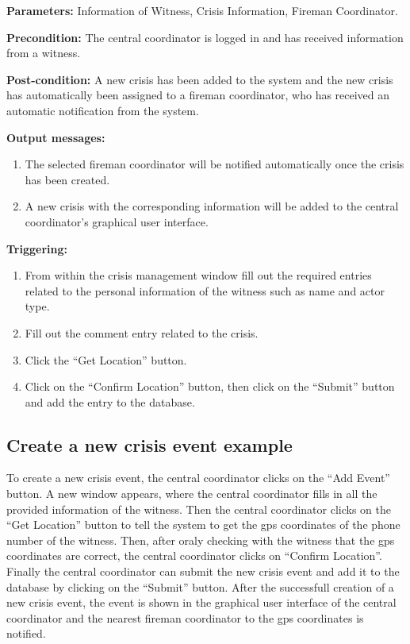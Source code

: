 \begin{description}

\item \textbf{Parameters:} Information of Witness, Crisis Information, Fireman
Coordinator.
\item \textbf{Precondition:} The central coordinator is logged in and has
received information from a witness.
\item \textbf{Post-condition:} A new crisis has been added to the system and the
new crisis has automatically been assigned to a fireman coordinator, who has
received an automatic notification from the system.
\item \textbf{Output messages:}\begin{enumerate}\item The selected fireman
coordinator will be notified automatically once the crisis has been created.
\item A new crisis with the corresponding information will be added to the
central coordinator's graphical user interface.
\end{enumerate}

\item \textbf{Triggering:}
\begin{enumerate}
\item From within the crisis management window fill out the required entries
related to the personal information of the witness such as name and actor type.
\item Fill out the comment entry related to the crisis.
\item Click the “Get Location” button.
\item Click on the “Confirm Location” button, then click on the “Submit”
button and add the entry to the database.
\end{enumerate}

 
\end{description}

 
\subsection{Create a new crisis event example}
To create a new crisis event, the central coordinator clicks on the “Add Event”
button. A new window appears, where the central coordinator fills in all the
provided information of the witness. Then the central coordinator clicks on the
“Get Location” button to tell the system to get the gps coordinates of the phone
number of the witness. Then, after oraly checking with the witness that the gps
coordinates are correct, the central coordinator clicks on “Confirm Location”.
Finally the central coordinator can submit the new crisis event and add it to
the database by clicking on the “Submit” button. After the successfull creation
of a new crisis event, the event is shown in the graphical user interface of the
central coordinator and the nearest fireman coordinator to the gps coordinates
is notified.


